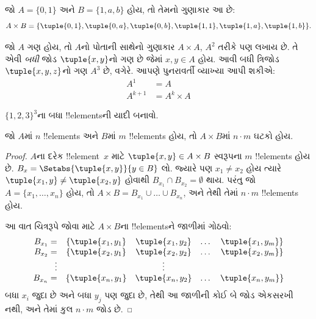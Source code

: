 \documentclass[../../../include/open-logic-section]{subfiles}
\begin{document}
\begin{ex}
જો $A = \{0, 1\}$ અને $B = \{1, a, b\}$ હોય, તો તેમનો ગુણાકાર આ છે:
\[
A \times B = \{ \tuple{0, 1}, \tuple{0, a}, \tuple{0, b},
    \tuple{1, 1}, \tuple{1, a}, \tuple{1, b} \}.
\]
\end{ex}

\begin{ex}
જો $A$ ગણ હોય, તો $A$નો પોતાની સાથેનો ગુણાકાર $A \times A$,
$A^2$ તરીકે પણ લખાય છે. તે એવી \emph{બધી} જોડ $\tuple{x, y}$નો ગણ છે
જેમાં $x, y \in A$ હોય. આવી બધી ત્રિજોડ $\tuple{x, y, z}$નો ગણ
$A^3$ છે, વગેરે. આપણે પુનરાવર્તી વ્યાખ્યા આપી શકીએ:
\begin{align*}
  A^1 & = A\\
  A^{k+1} & = A^k \times A
\end{align*}
\end{ex}

\begin{prob}
$\{1, 2, 3\}^3$ના બધા !!{element}sની યાદી બનાવો.
\end{prob}

\begin{prop}
જો $A$માં $n$ !!{element}s અને $B$માં $m$ !!{element}s હોય,
તો $A \times B$માં $n\cdot m$ ઘટકો હોય.
\end{prop}

\begin{proof}
$A$ના દરેક !!{element}~$x$ માટે $\tuple{x, y} \in A \times B$
સ્વરૂપના $m$ !!{element}s હોય છે.
$B_x = \Setabs{\tuple{x, y}}{y \in B}$ લો.
જ્યારે પણ $x_1 \neq x_2$ હોય ત્યારે $\tuple{x_1, y} \neq \tuple{x_2, y}$
હોવાથી $B_{x_1} \cap B_{x_2} = \emptyset$ થાય.
પરંતુ જો $A = \{x_1, \dots, x_n\}$ હોય, તો
$A \times B = B_{x_1} \cup \dots \cup B_{x_n}$,
અને તેથી તેમાં $n\cdot m$ !!{element}s હોય.

આ વાત ચિત્રરૂપે જોવા માટે $A \times B$ના !!{element}sને જાળીમાં ગોઠવો:
\[
\begin{array}{rcccc}
  B_{x_1} = & \{\tuple{x_1, y_1} & \tuple{x_1, y_2} & \dots & \tuple{x_1, y_m}\}\\
  B_{x_2} = & \{\tuple{x_2, y_1} & \tuple{x_2, y_2} & \dots & \tuple{x_2, y_m}\}\\
  \vdots & & \vdots\\
  B_{x_n} = & \{\tuple{x_n, y_1} & \tuple{x_n, y_2} & \dots & \tuple{x_n, y_m}\}
\end{array}
\]
બધા $x_i$ જુદા છે અને બધા $y_j$ પણ જુદા છે, તેથી આ જાળીની કોઈ બે જોડ
એકસરખી નથી, અને તેમાં કુલ $n\cdot m$ જોડ છે.
\end{proof}
\end{document}
